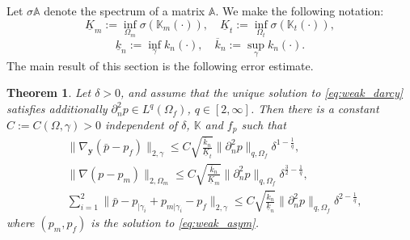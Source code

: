 \documentclass[a4paper]{article}
\newtheorem{theorem}{Theorem}
\def\vc#1{\mathbf{\boldsymbol{#1}}}     %
\def\tn#1{{\mathbb{#1}}}    %
\def\norm#1{\|#1\|}
\def\yy{{\vc y}}
\begin{document}
Let $\sigma\tn A$ denote the spectrum of a matrix $\tn A$.
We make the following notation:
\[ \underline K_m := \inf_{\Omega_m}\sigma(\tn K_m(\cdot)), \quad \underline K_t := \inf_{\Omega_t}\sigma(\tn K_t(\cdot)), \]
\[ \underline k_n := \inf_{\gamma}k_n(\cdot), \quad \overline k_n:=\sup_{\gamma}k_n(\cdot). \]
The main result of this section is the following error estimate.
\begin{theorem}
\label{th:error_estimate}
Let $\delta>0$, and assume that the unique solution to \eqref{eq:weak_darcy} satisfies additionally $\partial_n^2 p\in L^q(\Omega_f)$, $q\in[2,\infty]$.
Then there is a constant $C:=C(\Omega,\gamma)>0$ independent of $\delta$, $\tn K$ and $f_p$ such that
\begin{subequations}
\label{eq:error_estimates_delta}
\begin{align}
&\norm{\nabla_\yy(\bar p- p_f)}_{2,\gamma} \le C\sqrt{\frac{\overline k_n}{\underline K_t}}\norm{\partial_n^2 p}_{q,\Omega_f}\delta^{1-\frac1q},\\
&\norm{\nabla(p-p_m)}_{2,\Omega_m} \le C\sqrt{\frac{\overline k_n}{\underline K_m}}\norm{\partial_n^2 p}_{q,\Omega_f}\delta^{\frac32-\frac1q},\\
&\sum_{i=1}^2\norm{\bar p-p_{|\gamma_i}+p_{m|\gamma_i}-p_f}_{2,\gamma} \le C\sqrt{\frac{\overline k_n}{\underline k_n}}\norm{\partial_n^2 p}_{q,\Omega_f}\delta^{2-\frac1q},
\end{align}
\end{subequations}
where $(p_m,p_f)$ is the solution to \eqref{eq:weak_asym}.
\end{theorem}
\end{document}
